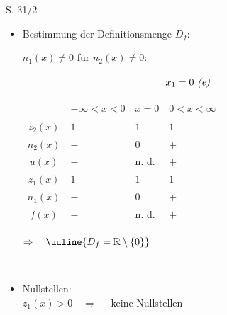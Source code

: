 \begin{Exercise}{S. 31/2}{}
\begin{enumerate}
\begin{enumerate}[label=\alph*)]
{                \begin{itemize}[leftmargin=*]
                    \item Bestimmung der Definitionsmenge $D_{f}$: \\[1.0ex]{
                        $n_{1}(x) \neq 0$ für $n_{2}(x) \neq 0$:\\[-2.0ex]
                        \begin{minipage}[t]{0.3\linewidth}
                            \vspace{-6.0ex}
                            \begin{align*}
                                x_{1} &= 0 \ \text{\textit{(e)}} && \\[-1.0ex]
                            \end{align*}
                        \end{minipage}
                        \hfill
                        \begin{minipage}[t]{0.6\linewidth}
                            \begin{tabularx}{0.95\linewidth}{c|X|X|X}
                                & $-\infty < x < 0$ & $x = 0$ & $0 < x < \infty$ \\ \hline
                                $z_{2}(x)$ & $1$ & $1$ & $1$ \\ \hline
                                $n_{2}(x)$ & $-$ & $0$ & $+$ \\ \hline
                                $u(x)$ & $-$ & n. d. & $+$ \\ \hline
                                $z_{1}(x)$ & $1$ & $1$ & $1$ \\ \hline
                                $n_{1}(x)$ & $-$ & $0$ & $+$ \\ \hline
                                $f(x)$ & $-$ & n. d. & $+$ \\            
                            \end{tabularx}  
                        \end{minipage}
                        $\Rightarrow \quad \uuline{D_{f} = \mathbb{R} \setminus \{0\}}$
                        }\\[-1.0ex]
                    \item Nullstellen: \\[1.0ex]{
                        $z_{1}(x) > 0 \quad \Rightarrow \quad$ keine Nullstellen\\[-1.0ex]
                        }
                \end{itemize}
}
\end{enumerate}
\end{enumerate}
\end{Exercise}
